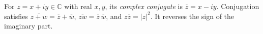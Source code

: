 
For $z=x+iy\in\mathbb C$ with real $x,y$, its \emph{complex conjugate} is $\overline z=x-iy$. Conjugation satisfies $\overline{z+w}=\overline z+\overline w$, $\overline{zw}=\overline z\,\overline w$, and $z\overline z=|z|^2$. It reverses the sign of the imaginary part.
